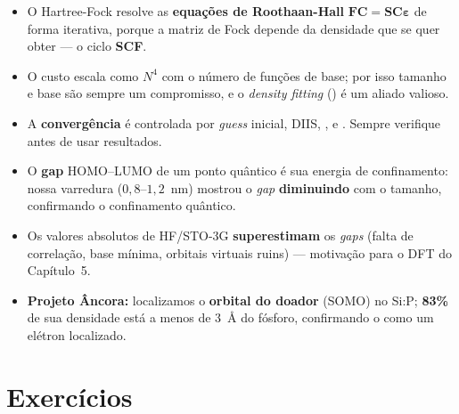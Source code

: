 \begin{itemize}[leftmargin=*]
  \item O Hartree-Fock resolve as \textbf{equações de Roothaan-Hall}
        $\mathbf{FC} = \mathbf{SC}\boldsymbol{\varepsilon}$ de forma iterativa,
        porque a matriz de Fock depende da densidade que se quer obter --- o ciclo
        \textbf{SCF}.
  \item O custo escala como $N^4$ com o número de funções de base; por isso
        tamanho e base são sempre um compromisso, e o \emph{density fitting}
        () é um aliado valioso.
  \item A \textbf{convergência} é controlada por \emph{guess} inicial, DIIS,
        ,  e . Sempre verifique
         antes de usar resultados.
  \item O \textbf{gap} HOMO--LUMO de um ponto quântico é sua energia de
        confinamento: nossa varredura ($0{,}8$--$1{,}2$~nm) mostrou o \emph{gap}
        \textbf{diminuindo} com o tamanho, confirmando o confinamento quântico.
  \item Os valores absolutos de HF/STO-3G \textbf{superestimam} os \emph{gaps}
        (falta de correlação, base mínima, orbitais virtuais ruins) --- motivação
        para o DFT do Capítulo~5.
  \item \textbf{Projeto Âncora:} localizamos o \textbf{orbital do doador} (SOMO) no
        Si:P; \textbf{83\%} de sua densidade está a menos de $3$~Å do fósforo,
        confirmando o \qubit{} como um elétron localizado.
\end{itemize}

\section*{Exercícios}

